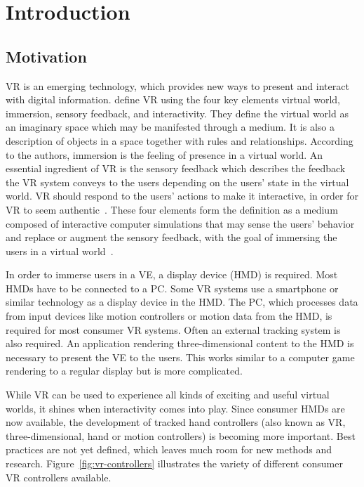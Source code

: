 \chapter{Introduction}\label{chapter:introduction}

\section{Motivation}\label{section:motivation}

\gls{VR} is an emerging technology, which provides new ways to present and interact with digital information. \citeauthor{Sherman.2003} define \gls{VR} using the four key elements virtual world, immersion, sensory feedback, and interactivity. They define the virtual world as an imaginary space which may be manifested through a medium. It is also a description of objects in a space together with rules and relationships. According to the authors, immersion is the feeling of presence in a virtual world. An essential ingredient of \gls{VR} is the sensory feedback which describes the feedback the \gls{VR} system conveys to the users depending on the users' state in the virtual world. %
\gls{VR} should respond to the users' actions to make it interactive, in order for \gls{VR} to seem authentic~\cite[6-13]{Sherman.2003}.
These four elements form the definition as a medium composed of interactive computer simulations that may sense the users' behavior and replace or augment the sensory feedback, with the goal of immersing the users in a virtual world~\cite[13-14]{Sherman.2003}.

In order to immerse users in a \gls{VE}, a display device (\gls{HMD}) is required. Most \glspl{HMD} have to be connected to a \gls{PC}. Some \gls{VR} systems use a smartphone or similar technology as a display device in the \gls{HMD}. The \gls{PC}, which processes data from input devices like motion controllers or motion data from the \gls{HMD}, is required for most consumer \gls{VR} systems. Often an external tracking system is also required. An application rendering three-dimensional content to the \gls{HMD} is necessary to present the \gls{VE} to the users. This works similar to a computer game rendering to a regular display but is more complicated.

While \gls{VR} can be used to experience all kinds of exciting and useful virtual worlds, it shines when interactivity comes into play. Since consumer \glspl{HMD} are now available, the development of tracked hand controllers (also known as \gls{VR}, three-dimensional, hand or motion controllers) is becoming more important.
Best practices are not yet defined, which leaves much room for new methods and research. Figure~\ref{fig:vr-controllers} illustrates the variety of different consumer \gls{VR} controllers available.

